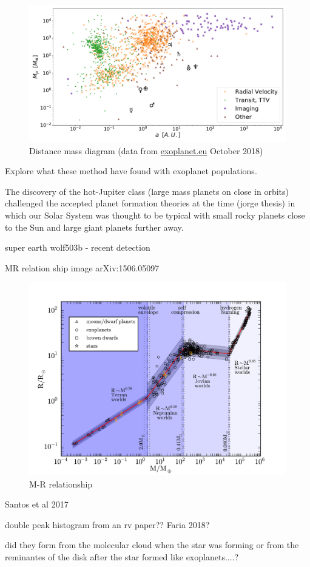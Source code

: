 \fref{}


\begin{figure}
    \centering
    \includegraphics[width=0.7\linewidth]{./figures/introduction/exoplanetEU_a_mass.pdf}
    \caption{Distance mass diagram (data from \href{http://ww.exoplanet.eu}{exoplanet.eu} October 2018)}
    \label{fig:pltoverlayadd}
\end{figure}


Explore what these method have found with exoplanet populations.

The discovery of the hot-Jupiter class (large mass planets on close in orbits) challenged the accepted planet formation theories at the time \citep[.e.g][]{pollack_formation_1996}(jorge thesis) in which our Solar System was thought to be typical with small rocky planets close to the Sun and large giant planets further away.


super earth wolf503b - recent detection


MR relation ship image arXiv:1506.05097~\citet{chen_probabilistic_2016}

\begin{figure}
    \centering
    \includegraphics[width=0.4\linewidth]{./figures/introduction/mass_radius_relation.pdf}
    \caption{M-R relationship~\citet{chen_probabilistic_2016}}
    \label{fig:mass_radius_relation}
\end{figure}

Santos et al 2017 


double peak histogram from an rv paper?? Faria 2018?


did they form from the molecular cloud when the star was forming or from the reminantes of the disk after the star formed like exoplanets....?


